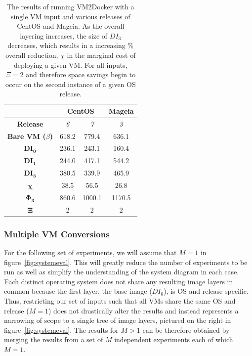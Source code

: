 \begin{table}[h]
\centering
    \begin{tabular}{| c | c | c | c |}
    \hline
& \multicolumn{2}{|c|}{\bfseries CentOS} & \multicolumn{1}{|c|}{\bfseries Mageia} \\ \hline
    \bfseries Release & \itshape 6 & \itshape 7 & \itshape 3 \\ \hline
    \bfseries Bare VM ($\beta$) & 618.2 & 779.4 & 636.1\\ \hline
    \bfseries $\boldsymbol{DI_0}$ & 236.1 & 243.1 & 160.4  \\ \hline
    \bfseries $\boldsymbol{DI_1}$ & 244.0 & 417.1 & 544.2 \\ \hline
    \bfseries $\boldsymbol{DI_3}$ & 380.5 & 339.9 & 465.9 \\ \hline
\bfseries $\boldsymbol{\chi}$ & 38.5 & 56.5 & 26.8 \\ \hline
     \bfseries $\boldsymbol{\Phi_3}$ & 860.6 & 1000.1 & 1170.5 \\ \hline
     \bfseries $\boldsymbol{\Xi}$ & 2 & 2 & 2 \\ \hline
    \end{tabular}
\caption{The results of running VM2Docker with a single VM input and various releases of CentOS and Mageia. As the overall layering increases, the size of $DI_3$ decreases, which results in a increasing \% overall reduction, $\chi$ in the marginal cost of deploying a given VM. For all inputs, $\Xi = 2$ and therefore space savings begin to occur on the second instance of a given OS release.}
\label{table:diffpm2}
\end{table}




\subsubsection{Multiple VM Conversions}
\label{sec:multivm}
For the following set of experiments, we will assume that $M=1$ in figure~\ref{fig:systemeval}. This will greatly reduce the number of experiments to be run as well as simplify the understanding of the system diagram in each case. Each distinct operating system does not share any resulting image layers in common because the first layer, the base image ($DI_0$), is OS and release-specific. Thus, restricting our set of inputs such that all VMs share the same OS and release ($M=1$) does not drastically alter the results and instead represents a narrowing of scope to a single tree of image layers, pictured on the right in figure~\ref{fig:systemeval}. The results for $M>1$ can be therefore obtained by merging the results from a set of $M$ independent experiments each of which $M=1$.

